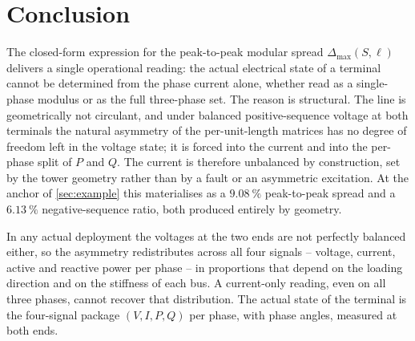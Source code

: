 
\section{Conclusion}
\label{sec:conclusions}

The closed-form expression for the peak-to-peak modular spread
$\Delta_{\max}(S,\ell)$ delivers a single operational reading: the
actual electrical state of a terminal cannot be determined from the
phase current alone, whether read as a single-phase modulus or as the
full three-phase set. The reason is structural. The line is
geometrically not circulant, and under balanced positive-sequence
voltage at both terminals the natural asymmetry of the per-unit-length
matrices has no degree of freedom left in the voltage state; it is
forced into the current and into the per-phase split of $P$ and $Q$.
The current is therefore unbalanced by construction, set by the tower
geometry rather than by a fault or an asymmetric excitation. At the
anchor of \autoref{sec:example} this materialises as a
$\SI{9.08}{\percent}$ peak-to-peak spread and a
$\SI{6.13}{\percent}$ negative-sequence ratio, both produced entirely
by geometry.

In any actual deployment the voltages at the two ends are not
perfectly balanced either, so the asymmetry redistributes across all
four signals -- voltage, current, active and reactive power per phase
-- in proportions that depend on the loading direction and on the
stiffness of each bus. A current-only reading, even on all three
phases, cannot recover that distribution. The actual state of the
terminal is the four-signal package $(V,I,P,Q)$ per phase, with phase
angles, measured at both ends.
